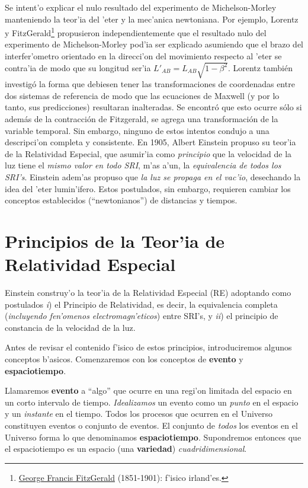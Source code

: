 Se intent'o explicar el nulo resultado del experimento de Michelson-Morley manteniendo la teor'ia del 'eter y la mec'anica newtoniana. Por ejemplo, Lorentz y FitzGerald\footnote{\href{{http://es.wikipedia.org/wiki/George_Francis_FitzGerald}}{George Francis FitzGerald} (1851-1901): f'isico irland'es.} propusieron independientemente que el resultado nulo del experimento de Michelson-Morley pod'ia ser explicado asumiendo que el brazo del interfer'ometro orientado en la direcci'on del movimiento respecto al 'eter se contra'ia de modo que su longitud ser'ia $L'_{AB}=L_{AB}\sqrt{1-\beta^2}$. Lorentz también investigó la forma que debiesen tener las transformaciones de coordenadas entre dos sistemas de referencia de modo que las ecuaciones de Maxwell (y por lo tanto, sus predicciones) resultaran inalteradas. Se encontró que esto ocurre sólo si además de la contracción de Fitzgerald, se agrega una transformación de la variable temporal. Sin embargo, ninguno de estos intentos condujo a una descripci'on completa y consistente. En 1905, Albert Einstein propuso su teor'ia de la Relatividad Especial, que asumir'ia como \textit{principio} que la velocidad de la luz tiene el \textit{mismo valor en todo SRI}, m'as a'un, la \textit{equivalencia de todos los SRI's}. Einstein adem'as propuso que \textit{la luz se propaga en el vac'io}, desechando la idea del 'eter lumin'ifero. Estos postulados, sin embargo, requieren cambiar los conceptos establecidos (``newtonianos'') de distancias y tiempos.

\section{Principios de la Teor'ia de Relatividad Especial}
Einstein construy'o la teor'ia de la Relatividad Especial (RE) adoptando como postulados \textit{i}) el Principio de Relatividad, es decir, la equivalencia completa (\textit{incluyendo fen'omenos electromagn'eticos}) entre SRI's,  y \textit{ii}) el principio de constancia de la velocidad de la luz.

Antes de revisar el contenido f'isico de estos principios, introduciremos algunos conceptos b'asicos. Comenzaremos con los conceptos de \textbf{evento} y \textbf{espaciotiempo}.

Llamaremos \textbf{evento} a ``algo'' que ocurre en una regi'on limitada del
espacio en un corto intervalo de tiempo. \textit{Idealizamos} un evento como un \textit{punto} en el espacio y un \textit{instante} en el tiempo. Todos los procesos que ocurren en el Universo constituyen eventos o conjunto de eventos.
El conjunto de \textit{todos} los eventos en el Universo forma lo que
denominamos \textbf{espaciotiempo}. Supondremos entonces que el espaciotiempo es un espacio (una \textbf{variedad}) \textit{cuadridimensional}.

